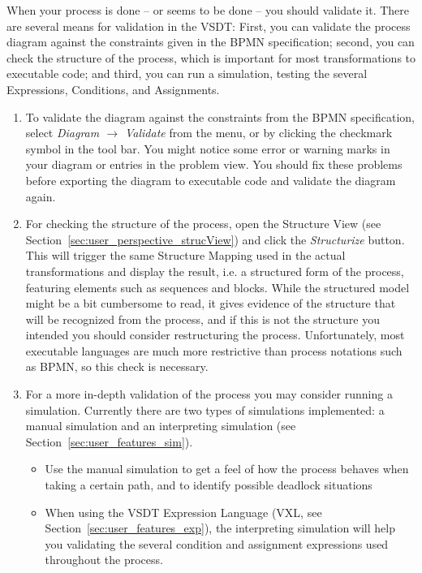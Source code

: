 When your process is done -- or seems to be done -- you should validate it.  There are several means for validation in the VSDT: First, you can validate the process diagram against the constraints given in the BPMN specification; second, you can check the structure of the process, which is important for most transformations to executable code; and third, you can run a simulation, testing the several Expressions, Conditions, and Assignments.

\begin{enumerate}

	\item To validate the diagram against the constraints from the BPMN specification, select \emph{Diagram $\rightarrow$ Validate} from the menu, or by clicking the checkmark symbol in the tool bar. You might notice some error or warning marks in your diagram or entries in the problem view. You should fix these problems before exporting the diagram to executable code and validate the diagram again.
	
	\item For checking the structure of the process, open the Structure View (see Section~\ref{sec:user_perspective_strucView}) and click the \emph{Structurize} button.  This will trigger the same Structure Mapping used in the actual transformations and display the result, i.e. a structured form of the process, featuring elements such as sequences and blocks.  While the structured model might be a bit cumbersome to read, it gives evidence of the structure that will be recognized from the process, and if this is not the structure you intended you should consider restructuring the process.  Unfortunately, most executable languages are much more restrictive than process notations such as BPMN, so this check is necessary.
	
	\item For a more in-depth validation of the process you may consider running a simulation.  Currently there are two types of simulations implemented: a manual simulation and an interpreting simulation (see Section~\ref{sec:user_features_sim}).
	\begin{itemize}
		\item Use the manual simulation to get a feel of how the process behaves when taking a certain path, and to identify possible deadlock situations
		\item When using the VSDT Expression Language (VXL, see Section~\ref{sec:user_features_exp}), the interpreting simulation will help you validating the several condition and assignment expressions used throughout the process.
	\end{itemize}

\end{enumerate}
	
